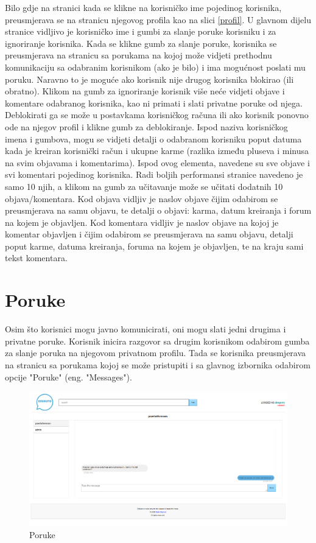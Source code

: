\documentclass{foi}
\begin{document}
Bilo gdje na stranici kada se klikne na korisničko ime pojedinog korisnika, preusmjerava se na stranicu njegovog profila kao na slici \ref{profil}. U glavnom dijelu stranice vidljivo je korisničko ime i gumbi za slanje poruke korisniku i za ignoriranje korisnika. Kada se klikne gumb za slanje poruke, korisnika se preusmjerava na stranicu sa porukama na kojoj može vidjeti prethodnu komunikaciju sa odabranim korisnikom (ako je bilo) i ima mogućnost poslati mu poruku. Naravno to je moguće ako korisnik nije drugog korisnika blokirao (ili obratno). Klikom na gumb za ignoriranje korisnik više neće vidjeti objave i komentare odabranog korisnika, kao ni primati i slati privatne poruke od njega. Deblokirati ga se može u postavkama korisničkog računa ili ako korisnik ponovno ode na njegov profil i klikne gumb za deblokiranje. Ispod naziva korisničkog imena i gumbova, mogu se vidjeti detalji o odabranom korisniku poput datuma kada je kreiran korisnički račun i ukupne karme (razlika između pluseva i minusa na svim objavama i komentarima). Ispod ovog elementa, navedene su sve objave i svi komentari pojedinog korisnika. Radi boljih performansi stranice navedeno je samo 10 njih, a klikom na gumb za učitavanje može se učitati dodatnih 10 objava/komentara. Kod objava vidljiv je naslov objave čijim odabirom se preusmjerava na samu objavu, te detalji o objavi: karma, datum kreiranja i forum na kojem je objavljen. Kod komentara vidljiv je naslov objave na kojoj je komentar objavljen i čijim odabirom se preusmjerava na samu objavu, detalji poput karme, datuma kreiranja, foruma na kojem je objavljen, te na kraju sami tekst komentara.

\section{Poruke}

Osim što korisnici mogu javno komunicirati, oni mogu slati jedni drugima i privatne poruke. Korisnik inicira razgovor sa drugim korisnikom odabirom gumba za slanje poruka na njegovom privatnom profilu. Tada se korisnika preusmjerava na stranicu sa porukama kojoj se može pristupiti i sa glavnog izbornika odabirom opcije "Poruke" (eng. "Messages"). 

\begin{figure}[h!]
    \centering
    \includegraphics[width=1\textwidth]{slike/poruke.png}
    \caption{Poruke}
    \label{poruke}
\end{figure}
\end{document}
